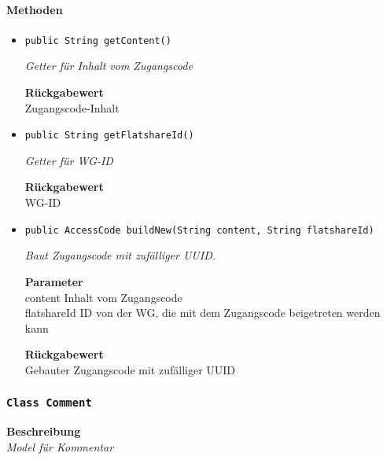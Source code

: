     \paragraph*{Methoden}
    \begin{itemize}
    	\item{\texttt{public String getContent()}}
    	
    	\textit{Getter für Inhalt vom Zugangscode}
    	
    	
    	
    	\textbf{Rückgabewert} \\
    	Zugangscode-Inhalt        \item{\texttt{public String getFlatshareId()}}
    	
    	\textit{Getter für WG-ID}
    	
    	
    	
    	\textbf{Rückgabewert} \\
    	WG-ID        \item{\texttt{public AccessCode buildNew(String content, String flatshareId)}}
    	
    	\textit{Baut Zugangscode mit zufälliger UUID.}
    	
    	\textbf{Parameter} \\
    	content Inhalt vom Zugangscode\\
    	flatshareId ID von der WG, die mit dem Zugangscode beigetreten werden kann
    	
    	\textbf{Rückgabewert} \\
    	Gebauter Zugangscode mit zufälliger UUID
    \end{itemize}
    \subsubsection{\texttt{Class Comment}}
    \textbf{Beschreibung} \\
    \textit{Model für Kommentar}
